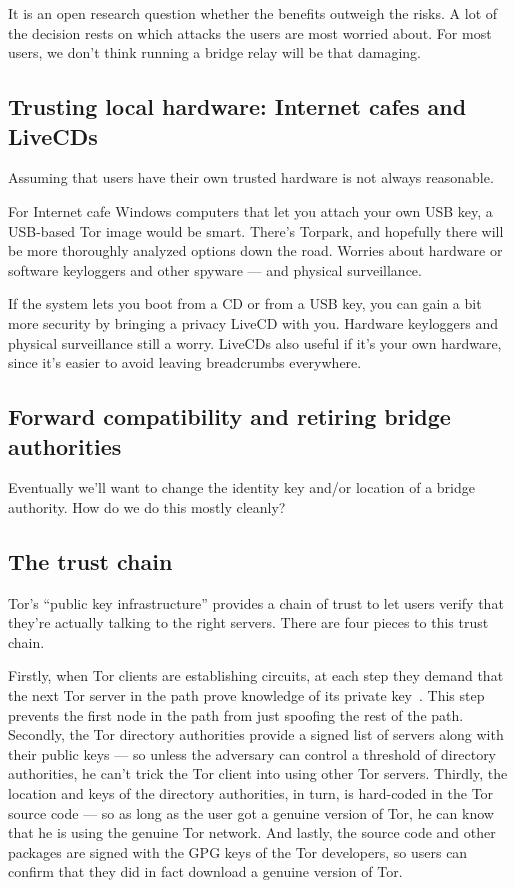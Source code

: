 \documentclass{llncs}
\begin{document}
It is an open research question whether the benefits outweigh the risks. A
lot of the decision rests on which attacks the users are most worried
about. For most users, we don't think running a bridge relay will be
that damaging.

\subsection{Trusting local hardware: Internet cafes and LiveCDs}
\label{subsec:cafes-and-livecds}

Assuming that users have their own trusted hardware is not
always reasonable.

For Internet cafe Windows computers that let you attach your own USB key,
a USB-based Tor image would be smart. There's Torpark, and hopefully
there will be more thoroughly analyzed options down the road. Worries
about hardware or
software keyloggers and other spyware --- and physical surveillance.

If the system lets you boot from a CD or from a USB key, you can gain
a bit more security by bringing a privacy LiveCD with you. Hardware
keyloggers and physical surveillance still a worry. LiveCDs also useful
if it's your own hardware, since it's easier to avoid leaving breadcrumbs
everywhere.

\subsection{Forward compatibility and retiring bridge authorities}

Eventually we'll want to change the identity key and/or location
of a bridge authority. How do we do this mostly cleanly?

\subsection{The trust chain}
\label{subsec:trust-chain}

Tor's ``public key infrastructure'' provides a chain of trust to
let users verify that they're actually talking to the right servers.
There are four pieces to this trust chain.

Firstly, when Tor clients are establishing circuits, at each step
they demand that the next Tor server in the path prove knowledge of
its private key~\cite{tor-design}. This step prevents the first node
in the path from just spoofing the rest of the path. Secondly, the
Tor directory authorities provide a signed list of servers along with
their public keys --- so unless the adversary can control a threshold
of directory authorities, he can't trick the Tor client into using other
Tor servers. Thirdly, the location and keys of the directory authorities,
in turn, is hard-coded in the Tor source code --- so as long as the user
got a genuine version of Tor, he can know that he is using the genuine
Tor network. And lastly, the source code and other packages are signed
with the GPG keys of the Tor developers, so users can confirm that they
did in fact download a genuine version of Tor.
\end{document}
